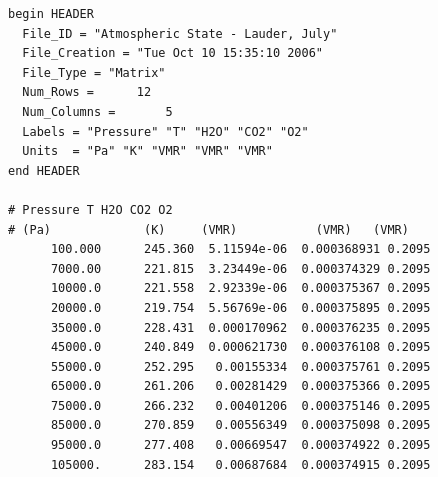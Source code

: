 \documentclass{article}
\begin{document}
\begin{verbatim}
begin HEADER
  File_ID = "Atmospheric State - Lauder, July"
  File_Creation = "Tue Oct 10 15:35:10 2006"
  File_Type = "Matrix"
  Num_Rows =      12
  Num_Columns =       5
  Labels = "Pressure" "T" "H2O" "CO2" "O2"
  Units  = "Pa" "K" "VMR" "VMR" "VMR"
end HEADER

# Pressure T H2O CO2 O2
# (Pa)             (K)     (VMR)           (VMR)   (VMR)
      100.000      245.360  5.11594e-06  0.000368931 0.2095
      7000.00      221.815  3.23449e-06  0.000374329 0.2095
      10000.0      221.558  2.92339e-06  0.000375367 0.2095
      20000.0      219.754  5.56769e-06  0.000375895 0.2095
      35000.0      228.431  0.000170962  0.000376235 0.2095
      45000.0      240.849  0.000621730  0.000376108 0.2095
      55000.0      252.295   0.00155334  0.000375761 0.2095
      65000.0      261.206   0.00281429  0.000375366 0.2095
      75000.0      266.232   0.00401206  0.000375146 0.2095
      85000.0      270.859   0.00556349  0.000375098 0.2095
      95000.0      277.408   0.00669547  0.000374922 0.2095
      105000.      283.154   0.00687684  0.000374915 0.2095
\end{verbatim}
\end{document}
